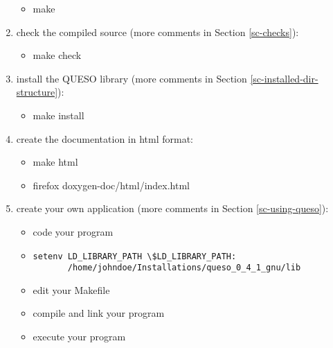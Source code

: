 \begin{enumerate}
{\begin{itemize}
\item make
\end{itemize}
}
\item {check the compiled source (more comments in Section \ref{sc-checks}): %
\begin{itemize}
\item make check
\end{itemize}
}
\item {install the QUESO library (more comments in Section \ref{sc-installed-dir-structure}): %
\begin{itemize}
\item make install
\end{itemize}
}
\item {create the documentation in html format: %
\begin{itemize}
\item make html
\item firefox doxygen-doc/html/index.html
\end{itemize}
}
\item {create your own application (more comments in Section \ref{sc-using-queso}): %
\begin{itemize}
\item code your program
\item {
\begin{verbatim}
setenv LD_LIBRARY_PATH \$LD_LIBRARY_PATH:
       /home/johndoe/Installations/queso_0_4_1_gnu/lib
\end{verbatim}
}
\item edit your Makefile
\item compile and link your program
\item execute your program
\end{itemize}
}
\end{enumerate}



